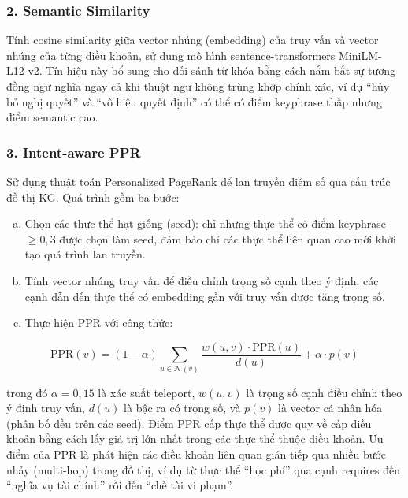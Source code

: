 \subsubsection*{2. Semantic Similarity}

Tính cosine similarity giữa vector nhúng (embedding) của truy vấn và vector nhúng
của từng điều khoản, sử dụng mô hình sentence-transformers MiniLM-L12-v2. Tín hiệu
này bổ sung cho đối sánh từ khóa bằng cách nắm bắt sự tương đồng ngữ nghĩa ngay
cả khi thuật ngữ không trùng khớp chính xác, ví dụ ``hủy bỏ nghị quyết'' và ``vô
hiệu quyết định'' có thể có điểm keyphrase thấp nhưng điểm semantic cao.

\subsubsection*{3. Intent-aware PPR}

Sử dụng thuật toán Personalized PageRank \cite{haveliwala2002ppr} để lan truyền
điểm số qua cấu trúc đồ thị KG. Quá trình gồm ba bước:

\begin{enumerate}[a)]
  \item Chọn các thực thể hạt giống (seed): chỉ những thực thể có điểm keyphrase
        $\geq 0{,}3$ được chọn làm seed, đảm bảo chỉ các thực thể liên quan cao
        mới khởi tạo quá trình lan truyền.

  \item Tính vector nhúng truy vấn để điều chỉnh trọng số cạnh theo ý định: các
        cạnh dẫn đến thực thể có embedding gần với truy vấn được tăng trọng số.

  \item Thực hiện PPR với công thức:
\end{enumerate}

\begin{equation}
  \text{PPR}(v) = (1 - \alpha) \sum_{u \in \mathcal{N}(v)}
                  \frac{w(u,v) \cdot \text{PPR}(u)}{d(u)}
                  + \alpha \cdot p(v)
  \label{eq:ppr}
\end{equation}

\noindent trong đó $\alpha = 0{,}15$ là xác suất teleport, $w(u,v)$ là trọng số
cạnh điều chỉnh theo ý định truy vấn, $d(u)$ là bậc ra có trọng số, và $p(v)$ là
vector cá nhân hóa (phân bố đều trên các seed). Điểm PPR cấp thực thể được quy về
cấp điều khoản bằng cách lấy giá trị lớn nhất trong các thực thể thuộc điều khoản.
Ưu điểm của PPR là phát hiện các điều khoản liên quan gián tiếp qua nhiều bước
nhảy (multi-hop) trong đồ thị, ví dụ từ thực thể ``học phí'' qua cạnh requires đến
``nghĩa vụ tài chính'' rồi đến ``chế tài vi phạm''.

